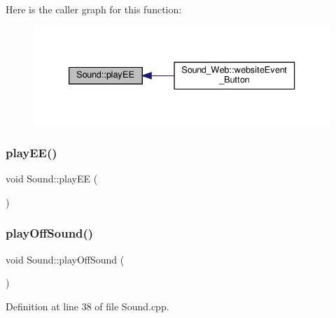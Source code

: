 Here is the caller graph for this function\+:
\nopagebreak
\begin{figure}[H]
\begin{center}
\leavevmode
\includegraphics[width=333pt]{class_sound_a887e5a54b6e00d4a33d63feb53017cfc_icgraph}
\end{center}
\end{figure}
\mbox{\label{class_sound_a887e5a54b6e00d4a33d63feb53017cfc}} 
\subsubsection{\texorpdfstring{play\+E\+E()}{playEE()}\hspace{0.1cm}{\footnotesize\ttfamily [2/2]}}
{\footnotesize\ttfamily void Sound\+::play\+EE (\begin{DoxyParamCaption}{ }\end{DoxyParamCaption})}

\mbox{\label{class_sound_a53aa4bec2fd464c5149ca30b29b35ac1}} 
\subsubsection{\texorpdfstring{play\+Off\+Sound()}{playOffSound()}\hspace{0.1cm}{\footnotesize\ttfamily [1/2]}}
{\footnotesize\ttfamily void Sound\+::play\+Off\+Sound (\begin{DoxyParamCaption}{ }\end{DoxyParamCaption})}



Definition at line 38 of file Sound.\+cpp.

